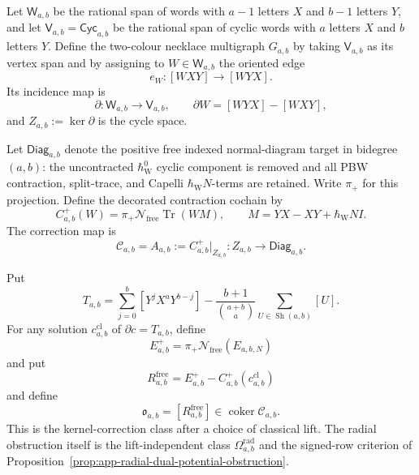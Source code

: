 \begin{defn}
\label{def:app-free-kernel-correction-obstruction}
  Let \(\mathsf W_{a,b}\) be the rational span of words with \(a-1\)
  letters \(X\) and \(b-1\) letters \(Y\), and let
  \(\mathsf V_{a,b}=\mathsf{Cyc}_{a,b}\) be the rational span of cyclic
  words with \(a\) letters \(X\) and \(b\) letters \(Y\).  Define the
  two-colour necklace multigraph \(G_{a,b}\) by taking
  \(\mathsf V_{a,b}\) as its vertex span and by assigning to
  \(W\in\mathsf W_{a,b}\) the oriented edge
  \[
    e_W:[WXY]\longrightarrow[WYX].
  \]
  Its incidence map is
  \[
    \partial\colon\mathsf W_{a,b}\to\mathsf V_{a,b},\qquad
    \partial W=[WYX]-[WXY],
  \]
  and \(Z_{a,b}:=\ker\partial\) is the cycle space.

  Let \(\mathsf{Diag}_{a,b}\) denote the positive free indexed
  normal-diagram target in bidegree \((a,b)\): the uncontracted
  \(\hbar_{\mathrm{W}}^0\) cyclic component is removed and all PBW contraction,
  split-trace, and Capelli \(\hbar_{\mathrm{W}} N\)-terms are retained.  Write
  \(\pi_+\) for this projection.  Define the decorated contraction
  cochain by
  \[
    C^+_{a,b}(W)
    =
    \pi_+\mathcal N_{\mathrm{free}}\operatorname{Tr}(WM),
    \qquad
    M=YX-XY+\hbar_{\mathrm{W}} NI.
  \]
  The correction map is
  \[
    \mathcal C_{a,b}=A_{a,b}:=
    C^+_{a,b}|_{Z_{a,b}}\colon
    Z_{a,b}\longrightarrow\mathsf{Diag}_{a,b}.
  \]

  Put
  \[
    T_{a,b}=
    \sum_{j=0}^b[Y^jX^aY^{b-j}]
    -\frac{b+1}{\binom{a+b}{a}}
      \sum_{U\in\operatorname{Sh}(a,b)}[U].
  \]
  For any solution \(c^{\mathrm{cl}}_{a,b}\) of
  \(\partial c=T_{a,b}\), define
  \[
    E^+_{a,b}
    =
    \pi_+\mathcal N_{\mathrm{free}}(E_{a,b,N})
  \]
  and put
  \[
    R_{a,b}^{\mathrm{free}}
    =
    E^+_{a,b}-C^+_{a,b}(c^{\mathrm{cl}}_{a,b})
  \]
  and define
  \[
    \mathfrak o_{a,b}
    =
    [R_{a,b}^{\mathrm{free}}]\in
    \operatorname{coker}\mathcal C_{a,b}.
  \]
  This is the kernel-correction class after a choice of classical lift.
  The radial obstruction itself is the lift-independent class
  \(\Omega^{\mathrm{rad}}_{a,b}\) and the signed-row criterion of
  Proposition~\ref{prop:app-radial-dual-potential-obstruction}.
\end{defn}


